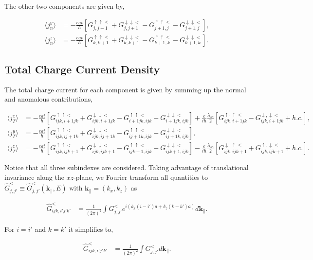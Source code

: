 \documentclass[10pt,prb,showpacs,amssymb,floatfix]{revtex4-1}
\newcommand{\dna}{\downarrow}
\newcommand{\para}{\parallel}
\newcommand{\upa}{\uparrow}
\newcommand{\h}{\hat}
\begin{document}
The other two components are given by,

\begin{align}
 \langle j_n^y \rangle &=  -\frac{eat}{\hbar}[ G_{j,j+1}^{\upa\upa <}+ G_{j,j+1}^{\dna\dna <} - G_{j+1,j}^{\upa\upa <}  - G_{j+1,j}^{\dna\dna <}], \\
 \langle j_n^z \rangle &=  -\frac{eat}{\hbar}[ G_{k,k+1}^{\upa\upa <}+ G_{k,k+1}^{\dna\dna <} - G_{k+1,k}^{\upa\upa <}  - G_{k+1,k}^{\dna\dna <}].
\end{align}

\subsection {Total Charge Current Density}
The total charge current for each component is given by summing up the normal and anomalous contributions, 

\begin{align}
\label{copjx}
\langle j_T^x \rangle &= -\frac{eat}{\hbar}[ G_{ijk,i+1jk}^{\upa\upa <}+ G_{ijk,i+1jk}^{\dna\dna <} - G_{i+1jk,ijk}^{\upa\upa <}  - G_{i+1jk,ijk}^{\dna\dna <}] +\frac{e}{i\hbar}\frac{\lambda_{so}}{2} [ G^{\upa,\upa <}_{ijk,i+1jk} - G^{\dna,\dna <}_{ijk,i+1jk}    +h.c. ], \\
\label{copjy}
\langle j_T^y \rangle &=-\frac{eat}{\hbar}[ G_{ijk,ij+1k}^{\upa\upa <}+ G_{ijk,ij+1k}^{\dna\dna <} - G_{ij+1k,ijk}^{\upa\upa <}  - G_{ij+1k,ijk}^{\dna\dna <}], \\
\langle j_T^z \rangle &=  -\frac{eat}{\hbar}[ G_{ijk,ijk+1}^{\upa\upa <}+ G_{ijk,ijk+1}^{\dna\dna <} - G_{ijk+1,ijk}^{\upa\upa <}  - G_{ijk+1,ijk}^{\dna\dna <}]  -\frac{e}{i\hbar}\frac{\lambda_{so}}{2} [ G^{\dna,\upa <}_{ijk,ijk+1} + G^{\upa,\dna <}_{ijk,ijk+1} +h.c.].
\label{copjz}
\end{align}

Notice that all three subindexes are considered. Taking advantage of translational invariance along the $xz$-plane, we Fourier transform all quantities to $\h G_{j,j'}^< \equiv \h G_{j,j'}^<(\bm k_{\para},E)$ with $\bm k_\para = (k_x,k_z)$ as

\begin{align}
\h G^{<}_{ijk,i'j'k'} &= \frac{1}{(2\pi)^2} \int G_{j,j'}^{<} e^{i(k_x(i-i')a+k_z(k-k')a)} d\bm k_\para.
\end{align}

For $i=i'$ and $k=k'$ it simplifies to,

\begin{align}
\h G^{<}_{ijk,i'j'k'} &= \frac{1}{(2\pi)^2} \int G_{j,j'}^{<} d\bm k_\para.
\end{align}
\end{document}
